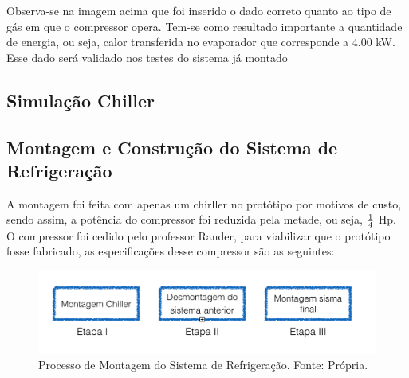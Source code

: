                Observa-se na imagem acima que foi inserido o dado correto quanto ao tipo de
                gás em que o compressor opera. Tem-se como resultado importante a quantidade
                de energia, ou seja, calor transferida no evaporador que corresponde a 4.00 kW.
                Esse dado será validado nos testes do sistema já montado

            \subsection[Simulação Chiller]{Simulação Chiller}

            \subsection[Montagem e Construção do Sistema de Refrigeração]{Montagem e Construção do Sistema de Refrigeração}
                A montagem foi feita com apenas um chirller no protótipo por motivos de custo,
                sendo assim, a potência do compressor foi reduzida pela metade, ou seja, $1 \over 4$ Hp.
                O compressor foi cedido pelo professor Rander, para viabilizar que o protótipo
                fosse fabricado, as especificações desse compressor são as seguintes:

                \begin{figure}[!htb]
            		\centering
            		\includegraphics[scale= 0.3]{figuras/montagem-chiler.png}
            		\caption{Processo de Montagem do Sistema de Refrigeração. Fonte: Própria.}
            		\label{simulacao-refrigeracao}
            	\end{figure}
                
